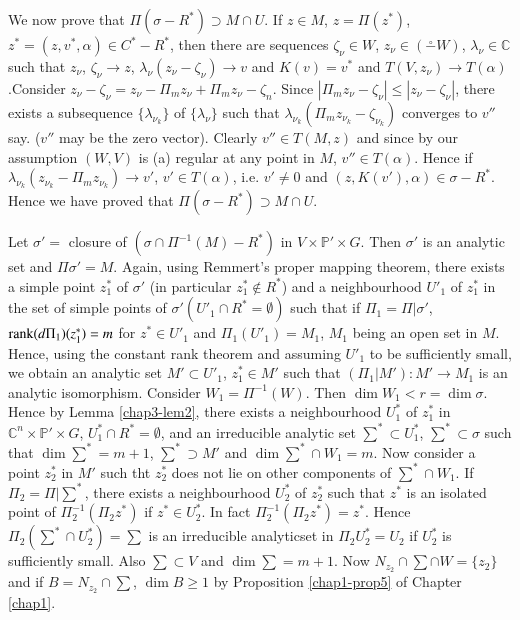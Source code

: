 We now prove that $\Pi(\sigma-R^{*})\supset M\cap U$. If $z\in M$,
$z=\Pi(z^{*})$, $z^{*}=(z,v^{*},\alpha)\in C^{*}-R^{*}$, then there
are sequences $\zeta_{\nu}\in W$, $z_{\nu}\in(\overset{\circ}-W)$,
$\lambda_{\nu}\in \mathbb{C}$ such that $z_{\nu}$, $\zeta_{\nu}\to z$,
$\lambda_{\nu}(z_{\nu}-\zeta_{\nu})\to v$ and $K(v)=v^{*}$ and
$T(V,z_{\nu})\to T(\alpha)$.\pageoriginale Consider
$z_{\nu}-\zeta_{\nu}=z_{\nu}-\Pi_{m}z_{\nu}+\Pi_{m}z_{\nu}-\zeta_{n}$. Since
$|\Pi_{m}z_{\nu}-\zeta_{\nu}|\leq |z_{\nu}-\zeta_{\nu}|$, there exists
a subsequence $\{\lambda_{\nu_{k}}\}$ of $\{\lambda_{\nu}\}$ such that
$\lambda_{\nu_{k}}(\Pi_{m}z_{\nu_{k}}-\zeta_{\nu_{k}})$ converges to
$v''$ say. ($v''$ may be the zero vector). Clearly $v''\in T(M,z)$ and
since by our assumption $(W,V)$ is (a) regular at any point in $M$,
$v''\in T(\alpha)$. Hence if
$\lambda_{\nu_{k}}(z_{\nu_{k}}-\Pi_{m}z_{\nu_{k}})\to v'$, $v'\in
T(\alpha)$, i.e. $v'\neq 0$ and
$(z,K(v'),\alpha)\in\sigma-R^{*}$. Hence we have proved that
$\Pi(\sigma-R^{*})\supset M\cap U$.


Let $\sigma'=$ closure of $(\sigma\cap \Pi^{-1}(M)-R^{*})$ in $V\times
\mathbb{P}'\times G$. Then $\sigma'$ is an analytic set and $\Pi
\sigma'=M$. Again, using Remmert's proper mapping theorem, there
exists a simple point $z^{*}_{1}$ of $\sigma'$ (in particular
$z^{*}_{1}\not\in R^{*}$) and a neighbourhood $U'_{1}$ of $z^{*}_{1}$
in the set of simple points of $\sigma'(U'_{1}\cap R^{*}=\emptyset)$
such that if $\Pi_{1}=\Pi|\sigma'$, $\operatorname{rank}(d\Pi_{1})(z^{*}_{1})=m$ for
$z^{*}\in U'_{1}$ and $\Pi_{1}(U'_{1})=M_{1}$, $M_{1}$ being an open
set in $M$. Hence, using the constant rank theorem and assuming
$U'_{1}$ to be sufficiently small, we obtain an analytic set
$M'\subset U'_{1}$, $z^{*}_{1}\in M'$ such that $(\Pi_{1}|M'):M'\to
M_{1}$ is an analytic isomorphism. Consider $W_{1}=\Pi^{-1}(W)$. Then
$\dim W_{1}<r=\dim \sigma$. Hence by Lemma \ref{chap3-lem2}, there
exists a neighbourhood $U^{*}_{1}$ of $z^{*}_{1}$ in
$\mathbb{C}^{n}\times \mathbb{P}'\times G$, $U^{*}_{1}\cap
R^{*}=\emptyset$, and an irreducible analytic set $\sum^{*}\subset
U^{*}_{1}$, $\sum^{\ast}\subset \sigma$ such that $\dim \sum^{*}=m+1$,
$\sum^{*}\supset M'$ and $\dim\sum^{*}\cap W_{1}=m$. Now consider a
point $z^{*}_{2}$ in $M'$ such tht $z^{*}_{2}$ does not lie on other
components of $\sum^{*}\cap W_{1}$. If $\Pi_{2}=\Pi|\sum^{*}$, there
exists a neighbourhood $U^{*}_{2}$ of $z^{*}_{2}$ such that $z^{*}$ is
an isolated point of $\Pi^{-1}_{2}(\Pi_{2}z^{*})$ if $z^{*}\in
U^{*}_{2}$. In fact $\Pi^{-1}_{2}(\Pi_{2}z^{*})=z^{*}$. Hence
$\Pi_{2}(\sum^{*}\cap U^{*}_{2})=\sum$ is an irreducible
analytic\pageoriginale set in $\Pi_{2}U^{*}_{2}=U_{2}$ if $U^{*}_{2}$
is sufficiently small. Also $\sum\subset V$ and $\dim \sum =m+1$. Now
$N_{z_{2}}\cap \sum\cap W=\{z_{2}\}$ and if $B=N_{z_{2}}\cap \sum$,
$\dim B\geq 1$ by Proposition \ref{chap1-prop5} of Chapter
\ref{chap1}.

